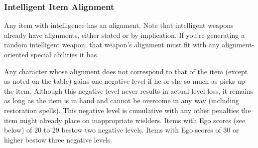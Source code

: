 \subsubsection{Intelligent Item Alignment}
Any item with intelligence has an alignment. Note that intelligent weapons already have alignments, either stated or by implication. If you're generating a random intelligent weapon, that weapon's alignment must fit with any alignment-oriented special abilities it has.

Any character whose alignment does not correspond to that of the item (except as noted on the table) gains one negative level if he or she so much as picks up the item. Although this negative level never results in actual level loss, it remains as long as the item is in hand and cannot be overcome in any way (including restoration spells). This negative level is cumulative with any other penalties the item might already place on inappropriate wielders. Items with Ego scores (see below) of 20 to 29 bestow two negative levels. Items with Ego scores of 30 or higher bestow three negative levels.


